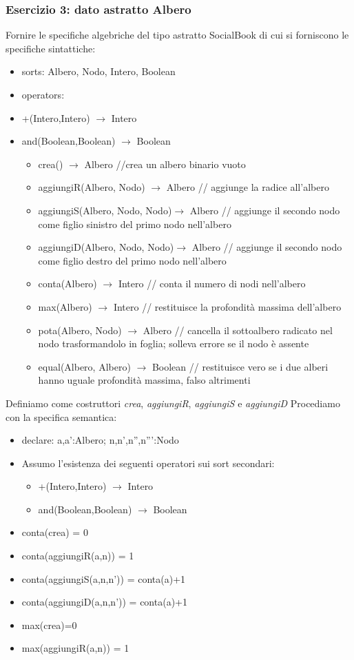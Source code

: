 \documentclass{article}
\begin{document}
	\subsubsection*{Esercizio 3: dato astratto Albero}
	Fornire le specifiche algebriche del tipo astratto SocialBook di cui si forniscono le specifiche sintattiche:
	\begin{itemize}
		\item sorts: Albero, Nodo, Intero, Boolean
		\item operators:
		\item +(Intero,Intero) $\rightarrow$ Intero
		\item and(Boolean,Boolean) $\rightarrow$ Boolean
		\begin{itemize}
			\item crea() $\rightarrow$ Albero //crea un albero binario vuoto
			\item aggiungiR(Albero, Nodo) $\rightarrow$ Albero // aggiunge la radice all'albero
			\item aggiungiS(Albero, Nodo, Nodo)$\rightarrow$ Albero // aggiunge il secondo nodo come figlio sinistro del primo nodo nell'albero
			\item aggiungiD(Albero, Nodo, Nodo)$\rightarrow$ Albero // aggiunge il secondo nodo come figlio destro del primo nodo nell'albero
			\item conta(Albero) $\rightarrow$ Intero // conta il numero di nodi nell'albero
			\item max(Albero) $\rightarrow$  Intero // restituisce  la profondità massima dell'albero
			\item pota(Albero, Nodo) $\rightarrow$  Albero // cancella il sottoalbero radicato nel nodo trasformandolo in foglia; solleva errore se il nodo è assente
			\item equal(Albero, Albero) $\rightarrow$  Boolean // restituisce  vero se i due alberi hanno uguale profondità massima, falso altrimenti
			
		\end{itemize}
	\end{itemize}
	Definiamo come costruttori \textit{crea}, \textit{aggiungiR}, \textit{aggiungiS} e \textit{aggiungiD}
	Procediamo con la specifica semantica:
	\begin{itemize}
		\item declare: a,a':Albero; n,n',n'',n''':Nodo
		\item Assumo l'esistenza dei seguenti operatori sui sort secondari:
		\begin{itemize}
			\item +(Intero,Intero) $\rightarrow$ Intero
			\item and(Boolean,Boolean) $\rightarrow$ Boolean
		\end{itemize}
		\item conta(crea) = 0
		\item conta(aggiungiR(a,n)) = 1
		\item conta(aggiungiS(a,n,n')) = conta(a)+1
		\item conta(aggiungiD(a,n,n')) = conta(a)+1
		\item max(crea)=0
		\item max(aggiungiR(a,n)) = 1
	\end{itemize}
\end{document}

